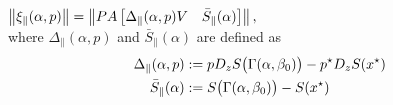 \documentclass[letterpaper, 10 pt, conference]{ieeeconf}
\begin{document}
\begin{lemma}\label{lem:hopfield-xi_para}
    \(\left\lVert{\ensuremath{\xi_{\parallel}(\alpha,p)}}\right\rVert = \left\lVert{P A \begin{bmatrix}\Delta_{\parallel}(\alpha,p) V & \bar{S}_{\parallel}(\alpha)\end{bmatrix}}\right\rVert,\)\\
    where \(\Delta_{\parallel}(\alpha,p)\) and \(\bar{S}_{\parallel}(\alpha)\) are defined as %
    \vspace{0mm} \begin{subequations}
        \begin{align} \label{eq:hopfield-xi_para_terms}
            \Delta_{\parallel}(\alpha,p) & := p D_{z}S\bigl(\Gamma(\alpha,\beta_0)\bigr) - p^{\star} D_{z}S(x^{\star}) \\
            \bar{S}_{\parallel}(\alpha)  & := S\bigl(\Gamma(\alpha,\beta_0)\bigr) - S(x^{\star})
        \end{align}
        \vspace{-3mm} \end{subequations}
\end{lemma}
\end{document}
